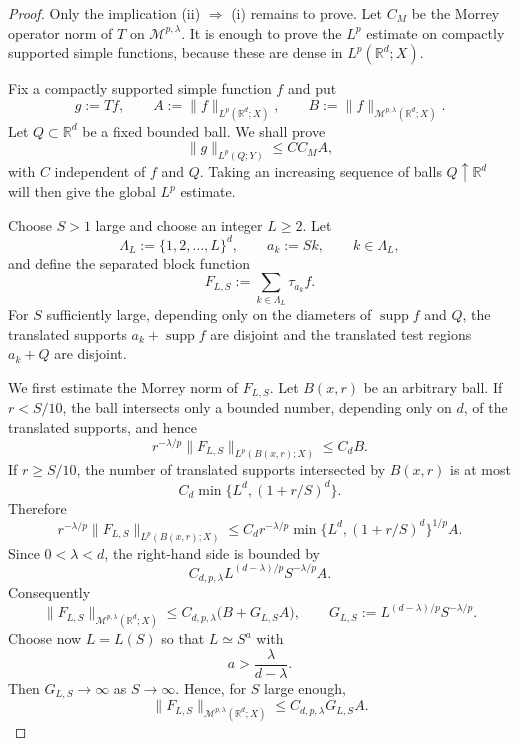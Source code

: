 \documentclass[10pt,a4paper]{amsart}
\newcommand{\R}{\mathbb R}
\begin{document}
	\begin{proof}
		Only the implication \textup{(ii)} $\Rightarrow$ \textup{(i)} remains to prove.  Let $C_M$ be the Morrey operator norm of $T$ on $\mathcal M^{p,\lambda}$.  It is enough to prove the $L^p$ estimate on compactly supported simple functions, because these are dense in $L^p(\R^d;X)$.

		Fix a compactly supported simple function $f$ and put
		\[
		g:=Tf,
		\qquad
		A:=\|f\|_{L^p(\R^d;X)},
		\qquad
		B:=\|f\|_{\mathcal M^{p,\lambda}(\R^d;X)}.
		\]
		Let $Q\subset\R^d$ be a fixed bounded ball.  We shall prove
		\[
		\|g\|_{L^p(Q;Y)}\le C C_M A,
		\]
		with $C$ independent of $f$ and $Q$.  Taking an increasing sequence of balls $Q\uparrow\R^d$ will then give the global $L^p$ estimate.

		Choose $S>1$ large and choose an integer $L\ge2$.  Let
		\[
		\Lambda_L:=\{1,2,\dots,L\}^d,
		\qquad
		a_k:=S k,
		\qquad k\in\Lambda_L,
		\]
		and define the separated block function
		\[
		F_{L,S}:=\sum_{k\in\Lambda_L}\tau_{a_k}f.
		\]
		For $S$ sufficiently large, depending only on the diameters of $\operatorname{supp}f$ and $Q$, the translated supports $a_k+\operatorname{supp}f$ are disjoint and the translated test regions $a_k+Q$ are disjoint.

		We first estimate the Morrey norm of $F_{L,S}$.  Let $B(x,r)$ be an arbitrary ball.  If $r<S/10$, the ball intersects only a bounded number, depending only on $d$, of the translated supports, and hence
		\[
		r^{-\lambda/p}\|F_{L,S}\|_{L^p(B(x,r);X)}\le C_d B.
		\]
		If $r\ge S/10$, the number of translated supports intersected by $B(x,r)$ is at most
		\[
		C_d\min\{L^d,(1+r/S)^d\}.
		\]
		Therefore
		\[
		r^{-\lambda/p}\|F_{L,S}\|_{L^p(B(x,r);X)}
		\le
		C_d r^{-\lambda/p}\min\{L^d,(1+r/S)^d\}^{1/p}A.
		\]
		Since $0<\lambda<d$, the right-hand side is bounded by
		\[
		C_{d,p,\lambda} L^{(d-\lambda)/p}S^{-\lambda/p}A.
		\]
		Consequently
		\[
		\|F_{L,S}\|_{\mathcal M^{p,\lambda}(\R^d;X)}
		\le
		C_{d,p,\lambda}\bigl(B+G_{L,S}A\bigr),
		\qquad
		G_{L,S}:=L^{(d-\lambda)/p}S^{-\lambda/p}.
		\]
		Choose now $L=L(S)$ so that $L\simeq S^a$ with
		\[
		a>\frac{\lambda}{d-\lambda}.
		\]
		Then $G_{L,S}\to\infty$ as $S\to\infty$.  Hence, for $S$ large enough,
		\[
		\|F_{L,S}\|_{\mathcal M^{p,\lambda}(\R^d;X)}
		\le
		C_{d,p,\lambda}G_{L,S}A.
		\]


\end{proof}
\end{document}
